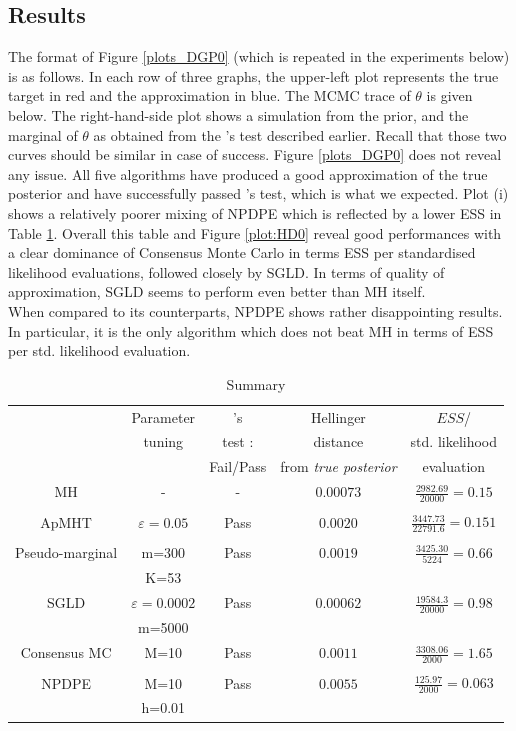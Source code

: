 \documentclass[11pt,a4paper]{report}\usepackage[]{graphicx}\usepackage[]{color}
\begin{document}
\subsection{Results}
The format of Figure \ref{plots_DGP0} (which is repeated in the experiments below) is as follows. In each row of three graphs, the upper-left plot represents the true target in red and the approximation in blue. The MCMC trace of $\theta$ is given below. The right-hand-side plot shows a simulation from the prior, and the marginal of $\theta$ as obtained from the \cite{geweke2004getting}'s test described earlier. Recall that those two curves should be similar in case of success.
Figure \ref{plots_DGP0} does not reveal any issue. All five algorithms have produced a good approximation of the true posterior and have successfully passed \cite{geweke2004getting}'s test, which is what we expected. Plot (i) shows a relatively poorer mixing of NPDPE which is reflected by a lower ESS in Table \ref{tab0}. Overall this table and Figure \ref{plot:HD0} reveal good performances with a clear dominance of Consensus Monte Carlo in terms ESS per standardised likelihood evaluations, followed closely by SGLD.  In terms of quality of approximation, SGLD seems to perform even better than MH itself. \\
When compared to its counterparts, NPDPE shows rather disappointing results. In particular, it is the only algorithm which does not beat MH in terms of ESS per std. likelihood evaluation.
\begin{table}
    \centering
    \caption{Summary}
    \label{tab0}
    \begin{tabular}{ccccc}
\hline
&Parameter &\cite{geweke2004getting}'s & Hellinger & $ESS$/\\
&tuning&test :&distance&std. likelihood\\
&&  Fail/Pass &  from \textit{true posterior} &    evaluation\\

\hline
MH &-& - & $0.00073$ & $\frac{2982.69}{20000}=0.15$ \\
&&&&\\
\hline
ApMHT &$\varepsilon=0.05$& Pass & $0.0020$ & $\frac{3447.73}{22791.6}=0.151$ \\
&&&&\\
\hline
Pseudo-marginal &m=300& Pass & $0.0019$ &$\frac{3425.30}{5224}=0.66$\\
&K=53&&&\\
\hline
SGLD &$\varepsilon=0.0002$& Pass & $0.00062$ & $\frac{19584.3}{20000}=0.98$\\
&m=5000&&&\\
\hline
Consensus MC &M=10& Pass & $0.0011$ & $\frac{3308.06}{2000}=1.65$\\
&&&&\\
\hline
NPDPE &M=10& Pass & $0.0055$&$\frac{125.97}{2000}=0.063$\\
&h=0.01&&&
\end{tabular}
\end{table}
\end{document}
